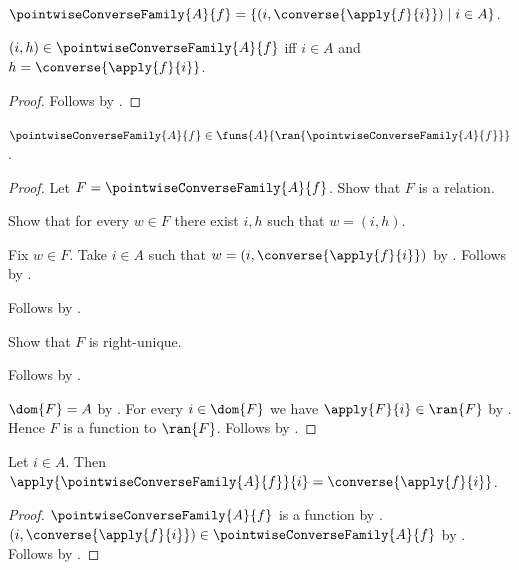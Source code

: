 \begin{definition}\label{pointwise_converse_family}
    $\pointwiseConverseFamily{A}{f}=
        \{(i,\converse{\apply{f}{i}})\mid i\in A\}$.
\end{definition}

\begin{proposition}\label{pointwise_converse_family_iff}
    $(i,h)\in\pointwiseConverseFamily{A}{f}$ iff
        $i\in A$ and $h=\converse{\apply{f}{i}}$.
\end{proposition}
\begin{proof}
    Follows by .
\end{proof}

\begin{proposition}\label{pointwise_converse_family_type}
    $\pointwiseConverseFamily{A}{f}\in
        \funs{A}{\ran{\pointwiseConverseFamily{A}{f}}}$.
\end{proposition}
\begin{proof}
    Let $F=\pointwiseConverseFamily{A}{f}$.
    Show that $F$ is a relation.
    \begin{subproof}
        Show that for every $w\in F$ there exist $i,h$ such that
            $w=(i,h)$.
        \begin{subproof}
            Fix $w\in F$.
            Take $i\in A$ such that
                $w=(i,\converse{\apply{f}{i}})$ by
                .
            Follows by \auto.
        \end{subproof}
        Follows by .
    \end{subproof}
    Show that $F$ is right-unique.
    \begin{subproof}
        Follows by
            .
    \end{subproof}
    $\dom{F}=A$ by
        .
    For every $i\in\dom{F}$ we have $\apply{F}{i}\in\ran{F}$ by
        .
    Hence $F$ is a function to $\ran{F}$.
    Follows by .
\end{proof}

\begin{proposition}\label{pointwise_converse_family_apply}
    Let $i\in A$.
    Then $\apply{\pointwiseConverseFamily{A}{f}}{i}
        =\converse{\apply{f}{i}}$.
\end{proposition}
\begin{proof}
    $\pointwiseConverseFamily{A}{f}$ is a function by
        .
    $(i,\converse{\apply{f}{i}})\in
        \pointwiseConverseFamily{A}{f}$ by
        .
    Follows by .
\end{proof}

